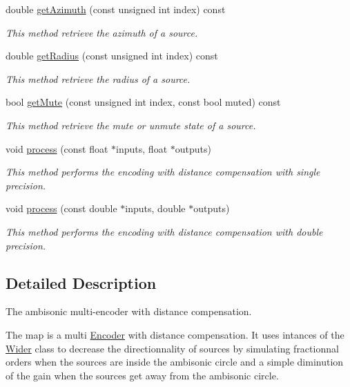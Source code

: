 \begin{DoxyCompactItemize}
double \hyperlink{class_hoa2_d_1_1_map_ae53d58090226e3139fccb8a75249bc3b}{get\-Azimuth} (const unsigned int index) const 
\begin{DoxyCompactList}\small\item\em This method retrieve the azimuth of a source. \end{DoxyCompactList}\item 
double \hyperlink{class_hoa2_d_1_1_map_a10d0058386c2738f6e11584c9e751c83}{get\-Radius} (const unsigned int index) const 
\begin{DoxyCompactList}\small\item\em This method retrieve the radius of a source. \end{DoxyCompactList}\item 
bool \hyperlink{class_hoa2_d_1_1_map_af3d625389cbce9e5e46a4532e39e2c5e}{get\-Mute} (const unsigned int index, const bool muted) const 
\begin{DoxyCompactList}\small\item\em This method retrieve the mute or unmute state of a source. \end{DoxyCompactList}\item 
void \hyperlink{class_hoa2_d_1_1_map_a933daf1cc1c8ad4df486d436f6d91450}{process} (const float $\ast$inputs, float $\ast$outputs)
\begin{DoxyCompactList}\small\item\em This method performs the encoding with distance compensation with single precision. \end{DoxyCompactList}\item 
void \hyperlink{class_hoa2_d_1_1_map_aa71ff518d419b54b409043ded7b8abd4}{process} (const double $\ast$inputs, double $\ast$outputs)
\begin{DoxyCompactList}\small\item\em This method performs the encoding with distance compensation with double precision. \end{DoxyCompactList}\end{DoxyCompactItemize}


\subsection{Detailed Description}
The ambisonic multi-\/encoder with distance compensation. 

The map is a multi \hyperlink{class_hoa2_d_1_1_encoder}{Encoder} with distance compensation. It uses intances of the \hyperlink{class_hoa2_d_1_1_wider}{Wider} class to decrease the directionnality of sources by simulating fractionnal orders when the sources are inside the ambisonic circle and a simple diminution of the gain when the sources get away from the ambisonic circle.

